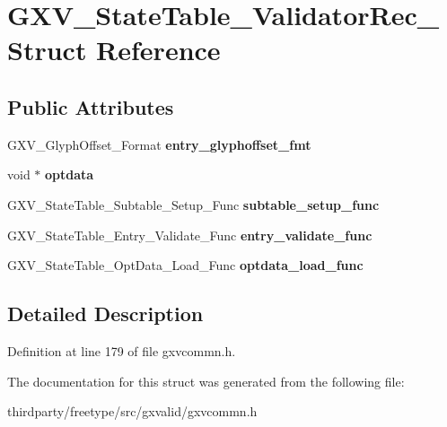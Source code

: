\hypertarget{struct_g_x_v___state_table___validator_rec__}{}\section{G\+X\+V\+\_\+\+State\+Table\+\_\+\+Validator\+Rec\+\_\+ Struct Reference}
\label{struct_g_x_v___state_table___validator_rec__}
\subsection*{Public Attributes}
\begin{DoxyCompactItemize}
\item 
\mbox{\label{struct_g_x_v___state_table___validator_rec___aaf4878ac492449e9aaa827ccffa6828d}} 
G\+X\+V\+\_\+\+Glyph\+Offset\+\_\+\+Format {\bfseries entry\+\_\+glyphoffset\+\_\+fmt}
\item 
\mbox{\label{struct_g_x_v___state_table___validator_rec___a44a24a5f3279d8608d3cf046cf48ee13}} 
void $\ast$ {\bfseries optdata}
\item 
\mbox{\label{struct_g_x_v___state_table___validator_rec___a4180efbe2cdb8158b1ec4a508a35905a}} 
G\+X\+V\+\_\+\+State\+Table\+\_\+\+Subtable\+\_\+\+Setup\+\_\+\+Func {\bfseries subtable\+\_\+setup\+\_\+func}
\item 
\mbox{\label{struct_g_x_v___state_table___validator_rec___a264644e0c4e9eb9ca952eda226def49b}} 
G\+X\+V\+\_\+\+State\+Table\+\_\+\+Entry\+\_\+\+Validate\+\_\+\+Func {\bfseries entry\+\_\+validate\+\_\+func}
\item 
\mbox{\label{struct_g_x_v___state_table___validator_rec___ac1faad3470643bd7753b6d41bcf43cb4}} 
G\+X\+V\+\_\+\+State\+Table\+\_\+\+Opt\+Data\+\_\+\+Load\+\_\+\+Func {\bfseries optdata\+\_\+load\+\_\+func}
\end{DoxyCompactItemize}


\subsection{Detailed Description}


Definition at line 179 of file gxvcommn.\+h.



The documentation for this struct was generated from the following file\+:\begin{DoxyCompactItemize}
\item 
thirdparty/freetype/src/gxvalid/gxvcommn.\+h\end{DoxyCompactItemize}
